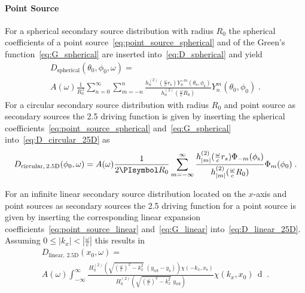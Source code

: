 \documentclass[a4paper]{book}
\newcommand{\reproduce}[1]{%
    \href{#1}{\color{link}\large\Pointinghand}%
}%
\newcommand{\ft}{\footnotesize}                                   %
\newcommand{\PI}{\PIsymbol}%
\newcommand{\D}[1]{\mathop{\mathrm{d}{#1}}}          %
\renewcommand{\vec}[1]{\mathbf{#1}}                  %
\newcommand{\x}{\vec{x}}                             %
\newcommand{\xs}{\x_\text{s}}                        %
\newcommand{\xref}{\x_\text{ref}}                    %
\newcommand{\omegac}{\frac{\omega}{c}}               %
\renewcommand{\H}[2]{\,H_{#1}^{(#2)}\!}              %
\newcommand{\qp}{\;.}                                             %
\def \twohalfD {{2.5\text{D}}\xspace}                             %
\newcommand\eqlabel[2][]{%
  \label{eq:#2}%
}
\begin{document}
{\paragraph{Point Source}
%
For a spherical secondary source distribution with radius $R_0$ the spherical
coefficients of a point source~\eqref{eq:point_source_spherical} and of the Green's
function~\eqref{eq:G_spherical} are inserted into~\eqref{eq:D_spherical} and yield
%
\begin{multline}
    D_\text{spherical}(\theta_0,\phi_0,\omega) = \\
    A(\omega) \frac{1}{R_0^{\,2}} \sum_{n=0}^\infty \sum_{m=-n}^n
    \frac{h_n^{(2)}(\omegac r_\text{s}) Y_n^{-m}(\theta_\text{s},\phi_\text{s})}
    {h_n^{(2)}(\omegac R_0)} Y_n^m (\theta_0,\phi_0) \qp
    \eqlabel{D:hoa:ps:3D}
\end{multline}
%
%    
%
For a circular secondary source distribution with radius $R_0$ and point source
as secondary sources the \twohalfD driving function is given by inserting the
spherical coefficients~\eqref{eq:point_source_spherical} and~\eqref{eq:G_spherical}
into~\eqref{eq:D_circular_25D} as
%
\begin{equation}
    D_{\text{circular},\,\twohalfD}(\phi_0,\omega) = A(\omega) \frac{1}{2\PI R_0}
        \sum_{m=-\infty}^{\infty}
        \frac{h_{|m|}^{(2)} (\omegac r_s) \Phi_{-m}(\phi_\text{s})} 
        {h_{|m|}^{(2)} (\omegac R_0)} \Phi_m(\phi_0) \qp
    \eqlabel{D:hoa:ps:2.5D}
\end{equation}
%

For an infinite linear secondary source distribution located on the $x$-axis and
point sources as secondary sources the \twohalfD driving function for a
point source is given by inserting the corresponding linear expansion
coefficients~\eqref{eq:point_source_linear} and~\eqref{eq:G_linear}
into~\eqref{eq:D_linear_25D}. Assuming
$0 \le |k_x| < |\omegac|$ this results
in\cite[Compare (4.53) in][]{Ahrens2012}
%
\begin{multline}
    D_{\text{linear},\,\twohalfD}(x_0,\omega) = \\
    A(\omega) \int_{-\infty}^\infty \frac{
    \H{0}{2}\left(\sqrt{(\omegac)^2-k_x^2} \; (y_\text{ref}-y_\text{s}) \right)
    \chi(-k_x,x_\text{s})} {\H{0}{2}\left(\sqrt{(\omegac)^2-k_x^2} \;
    y_\text{ref}\right)} \chi(k_x,x_0) \, \D{k_x} \qp
    \eqlabel{D:sdm:ps:2.5D}
\end{multline}
%


}
\end{document}
